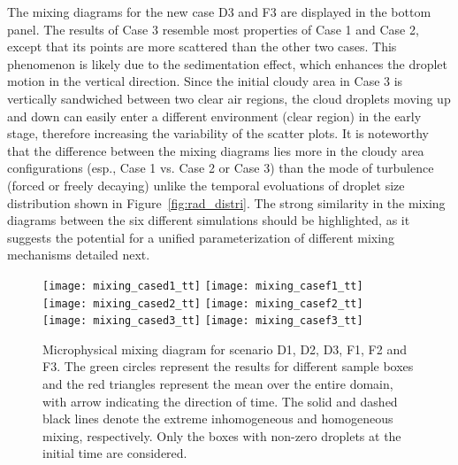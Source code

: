 \documentclass[draft,linenumbers]{agujournal}
\newcommand{\Fig}[1]{Figure~\ref{#1}}
\begin{document}
The mixing diagrams for {\color{green}the new} case D3 and F3 are displayed in the bottom panel. {\color{green}The results of} Case 3 resemble most properties of Case 1 and Case 2, except that its points are more scattered than the other two cases. This phenomenon is likely due to the sedimentation effect, which enhances the droplet motion in the vertical direction. Since the initial cloudy area in Case 3 is vertically sandwiched between two clear air regions, the cloud droplets moving up and down can easily enter a different environment (clear region) in the early stage, therefore increasing the variability of the scatter plots. {\color{green}It is noteworthy that the difference between the mixing diagrams lies more in the cloudy area configurations (esp., Case 1 vs. Case 2 or Case 3) than the mode of turbulence (forced or freely decaying) unlike the temporal evoluations of droplet size distribution shown in \Fig{fig:rad_distri}.  The strong similarity in the mixing diagrams between the six different simulations should be highlighted, as it suggests the potential for a unified parameterization of different mixing mechanisms detailed next.}

\begin{figure}[!htbp]\centering
\texttt{[image: mixing\_cased1\_tt]}
\texttt{[image: mixing\_casef1\_tt]}\\
\texttt{[image: mixing\_cased2\_tt]}
\texttt{[image: mixing\_casef2\_tt]}\\
\texttt{[image: mixing\_cased3\_tt]}
\texttt{[image: mixing\_casef3\_tt]}
\caption{Microphysical mixing diagram for scenario D1, D2, D3, F1, F2 and F3. The green
circles represent the results for different sample boxes and the red triangles represent the mean over the entire domain, with arrow indicating the direction of time. The solid and dashed black lines denote the extreme inhomogeneous and homogeneous mixing, respectively. Only the boxes with non-zero droplets at the initial time are considered.}
\label{fig:mixing_diagram}
\end{figure}
\end{document}
